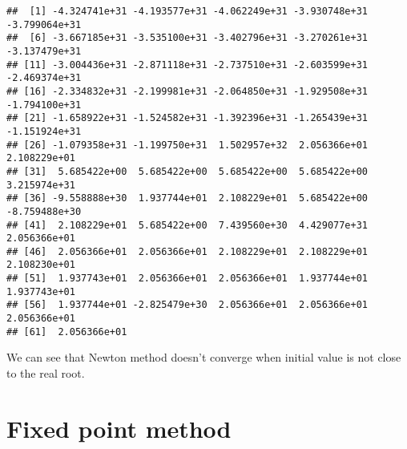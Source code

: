 \documentclass[]{book}
\theoremstyle{definition}
\theoremstyle{definition}
\theoremstyle{definition}
\theoremstyle{remark}
\begin{document}
\begin{verbatim}
##  [1] -4.324741e+31 -4.193577e+31 -4.062249e+31 -3.930748e+31 -3.799064e+31
##  [6] -3.667185e+31 -3.535100e+31 -3.402796e+31 -3.270261e+31 -3.137479e+31
## [11] -3.004436e+31 -2.871118e+31 -2.737510e+31 -2.603599e+31 -2.469374e+31
## [16] -2.334832e+31 -2.199981e+31 -2.064850e+31 -1.929508e+31 -1.794100e+31
## [21] -1.658922e+31 -1.524582e+31 -1.392396e+31 -1.265439e+31 -1.151924e+31
## [26] -1.079358e+31 -1.199750e+31  1.502957e+32  2.056366e+01  2.108229e+01
## [31]  5.685422e+00  5.685422e+00  5.685422e+00  5.685422e+00  3.215974e+31
## [36] -9.558888e+30  1.937744e+01  2.108229e+01  5.685422e+00 -8.759488e+30
## [41]  2.108229e+01  5.685422e+00  7.439560e+30  4.429077e+31  2.056366e+01
## [46]  2.056366e+01  2.056366e+01  2.108229e+01  2.108229e+01  2.108230e+01
## [51]  1.937743e+01  2.056366e+01  2.056366e+01  1.937744e+01  1.937743e+01
## [56]  1.937744e+01 -2.825479e+30  2.056366e+01  2.056366e+01  2.056366e+01
## [61]  2.056366e+01
\end{verbatim}

We can see that Newton method doesn't converge when initial value is not
close to the real root.

\section{Fixed point method}\label{fixed-point-method}
\end{document}
